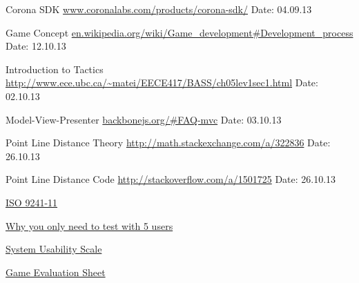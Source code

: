 \begin{thebibliography}{99}
	Corona SDK\newline
	\href {http://www.coronalabs.com/products/corona-sdk/}{www.coronalabs.com/products/corona-sdk/}\newline
	Date: 04.09.13

	Game Concept\newline
	\href {en.wikipedia.org/wiki/Game\_development#Development\_process}{en.wikipedia.org/wiki/Game\_development\#Development\_process}\newline
	Date: 12.10.13

	Introduction to Tactics\newline
	\url {http://www.ece.ubc.ca/~matei/EECE417/BASS/ch05lev1sec1.html}\newline
	Date: 02.10.13

	Model-View-Presenter\newline
	\href {http://backbonejs.org/\#FAQ-mvc}{backbonejs.org/\#FAQ-mvc}\newline
	Date: 03.10.13

	Point Line Distance Theory\newline
	\href {http://math.stackexchange.com/a/322836}{http://math.stackexchange.com/a/322836}\newline
	Date: 26.10.13

	Point Line Distance Code\newline
	\href {http://stackoverflow.com/a/1501725}{http://stackoverflow.com/a/1501725}\newline
	Date: 26.10.13

	\href {http://en.wikipedia.org/wiki/ISO_9241#ISO_9241-11}{ISO 9241-11}

	\href {http://www.nngroup.com/articles/why-you-only-need-to-test-with-5-users/}{Why you only need to test with 5 users}

	\href {http://www.measuringusability.com/sus.php}{System Usability Scale}

	\href {http://thebiggamehunter.com/game-evaluation-sheet/}{Game Evaluation Sheet}

\end{thebibliography}